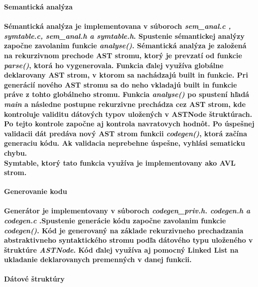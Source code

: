 \documentclass[12pt]{article}
\begin{document}
 \Large \textbf{Semantická analýza}\normalsize \\
\noindent\makebox[\linewidth]{\rule{\textwidth}{0.4pt}}

\paragraph{Sémantická analýza je implementovana v súboroch \textit{sem\_anal.c , symtable.c, sem\_anal.h a symtable.h}. Spustenie sémantickej analýzy započne zavolanim funkcie \textit{analyse()}. Sémantická analýza je založená na rekurzivnom prechode AST stromu, ktorý je prevzatí od funkcie \textit{parse()}, ktorá ho vygenerovala. Funkcia ďalej využíva globálne deklarovany AST strom, v ktorom sa nachádzajú built in funkcie. Pri generácií nového AST stromu sa do neho vkladajú built in funkcie práve z tohto globálneho stromu. Funkcia \textit{analyse()} po spustení hľadá \textit{main} a následne postupne rekurzivne prechádza cez AST strom, kde kontroluje validitu dátových typov uložených v ASTNode štruktúrach. Po tejto kontrole započne aj kontrola navratovych hodnôt. Po úspešnej validacii dát predáva nový AST strom funkcii \textit{codegen()}, ktorá začína generaciu kódu. Ak validacia neprebehne úspešne, vyhlási sematicku chybu. \newline \\
Symtable, ktorý tato funkcia využíva je implementovany ako AVL strom.  \newline \\}

 \Large \textbf{Generovanie kodu} \normalsize \\
\noindent\makebox[\linewidth]{\rule{\textwidth}{0.4pt}}

\paragraph{Generátor je implementovany v súboroch \textit{codegen\_priv.h. codegen.h a codegen.c }.Spustenie generácie kódu započne zavolanim funkcie \textit{codegen()}. Kód je generovaný na základe rekurzivneho prechadzania abstraktivneho syntaktického stromu podľa dátového typu uloženého v štruktúre \textit{ASTNode}. Kód ďalej využíva aj pomocný Linked List na ukladanie deklarovanych premenných v danej funkcii. \newline \\}


\newpage

 \Large \textbf{Dátové štruktúry}\normalsize \\
\noindent\makebox[\linewidth]{\rule{\textwidth}{0.4pt}}
\end{document}
